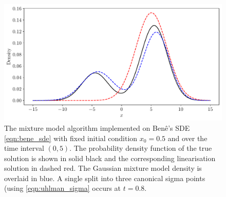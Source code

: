 \begin{figure}
	\centering
	\includegraphics[width=\textwidth]{chp05_gmm/figures/bene_final_gmm}
	\caption{The mixture model algorithm implemented on Ben\^e's SDE \cref{eqn:bene_sde} with fixed initial condition \(x_0 = 0.5\) and over the time interval \((0,5)\).
		The probability density function of the true solution is shown in solid black and the corresponding linearisation solution in dashed red.
		The Gaussian mixture model density is overlaid in blue.
		A single split into three canonical sigma points (using \cref{eqn:uhlman_sigma} occurs at \(t = 0.8\).}
	\label{fig:bene_gmm}
\end{figure}


